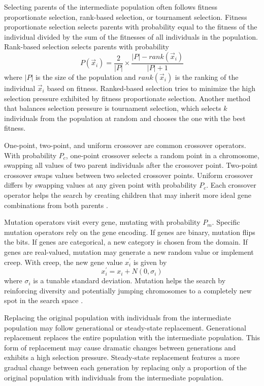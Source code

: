 \documentclass[twoside,11pt]{article}
\begin{document}
	Selecting parents of the intermediate population often follows fitness proportionate selection, rank-based selection, or tournament selection. Fitness proportionate selection selects parents with probability equal to the fitness of the individual divided by the sum of the fitnesses of all individuals in the population. Rank-based selection selects parents with probability
	$$P(\vec{x}_i) = \frac{2}{|P|} \times \frac{|P| - rank(\vec{x}_i)}{|P|+1}$$
	where $|P|$ is the size of the population and $rank(\vec{x}_i)$ is the ranking of the individual $\vec{x}_i$ based on fitness. Ranked-based selection tries to minimize the high selection pressure exhibited by fitness proportionate selection. Another method that balances selection pressure is tournament selection, which selects $k$ individuals from the population at random and chooses the one with the best fitness.

	One-point, two-point, and uniform crossover are common crossover operators. With probability $P_c$, one-point crossover selects a random point in a chromosome, swapping all values of two parent individuals after the crossover point. Two-point crossover swaps values between two selected crossover points. Uniform crossover differs by swapping values at any given point with probability $P_c$. Each crossover operator helps the search by creating children that may inherit more ideal gene combinations from both parents \citep{ga_tutorial}.


	Mutation operators visit every gene, mutating with probability $P_m$. Specific mutation operators rely on the gene encoding. If genes are binary, mutation flips the bits. If genes are categorical, a new category is chosen from the domain. If genes are real-valued, mutation may generate a new random value or implement creep. With creep, the new gene value $x_i^\prime$ is given by
	$$x_i^\prime = x_i + N(0, \sigma_i)$$
	where $\sigma_i$ is a tunable standard deviation. Mutation helps the search by reinforcing diversity and potentially jumping chromosomes to a completely new spot in the search space \citep{ga_tutorial}.

	Replacing the original population with individuals from the intermediate population may follow generational or steady-state replacement. Generational replacement replaces the entire population with the intermediate population. This form of replacement may cause dramatic changes between generations and exhibits a high selection pressure. Steady-state replacement features a more gradual change between each generation by replacing only a proportion of the original population with individuals from the intermediate population.
\end{document}
